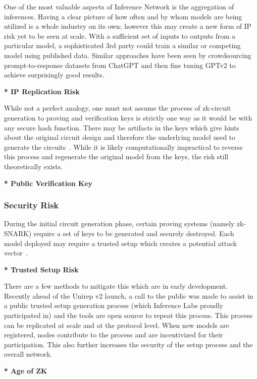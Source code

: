 \documentclass[conference]{IEEEtran}
\begin{document}
One of the most valuable aspects of Inference Network is the aggregation of inferences. Having a clear picture of how often and by whom models are being utilized is a whole industry on its own; however this may create a new form of IP risk yet to be seen at scale. With a sufficient set of inputs to outputs from a particular model, a sophisticated 3rd party could train a similar or competing model using published data. Similar approaches have been seen by crowdsourcing prompt-to-response datasets from ChatGPT and then fine tuning GPTv2 to achieve surprisingly good results.

\textbf{* IP Replication Risk}

While not a perfect analogy, one must not assume the process of zk-circuit generation to proving and veriﬁcation keys is strictly one way as it would be with any secure hash function. There may be artifacts in the keys which give hints about the original circuit design and therefore the underlying model used to generate the circuits~\cite{BenSasson2014SuccinctNZ}. While it is likely computationally impractical to reverse this process and regenerate the original model from the keys, the risk still theoretically exists.

\textbf{* Public Veriﬁcation Key}

\subsubsection{Security Risk}

During the initial circuit generation phase, certain proving systems (namely zk-SNARK) require a set of keys to be generated and securely destroyed. Each model deployed may require a trusted setup which creates a potential attack vector~\cite{Bowe2017ScalableMC}.

\textbf{* Trusted Setup Risk}

There are a few methods to mitigate this which are in early development. Recently ahead of the Unirep v2 launch, a call to the public was made to assist in a public trusted setup generation process (which Inference Labs proudly participated in) and the tools are open source to repeat this process. This process can be replicated at scale and at the protocol level. When new models are registered, nodes contribute to the process and are incentivized for their participation. This also further increases the security of the setup process and the overall network.


\textbf{* Age of ZK}
\end{document}
